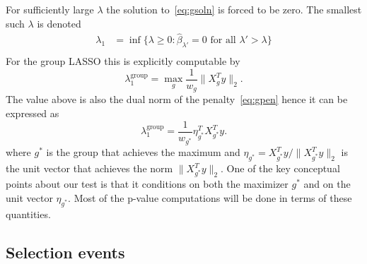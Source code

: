 \documentclass{imsart}
\begin{document}
For sufficiently large $\lambda$ the solution to~\eqref{eq:gsoln} is forced
to be zero. The smallest such $\lambda$ is denoted
\begin{equation}
  \begin{aligned}
   \lambda_1 &= \inf \{ \lambda \geq 0 : \hat \beta_{\lambda'} = 0 \text{ for all } \lambda' > \lambda \} \\
  \end{aligned}
\end{equation}
For the group LASSO this is explicitly computable by
\begin{equation}
\label{eq:lammax}
\lambda_1^{\text{group}} = \max_{g} \frac{1}{w_g}\|X_g^Ty\|_2 . 
\end{equation}
The value above is also the dual norm of the penalty~\eqref{eq:gpen}
hence it can be expressed as
\begin{equation}
\label{eq:lammax}
\lambda_1^{\text{group}}
 = \frac{1}{w_{g^*}}\eta_{g^*}^TX_{g^*}^Ty . 
\end{equation}
where $g^*$ is the group that achieves the maximum and 
$\eta_{g^*} = X_{g^*}^Ty / \|X_{g^*}^Ty\|_2$ is the unit vector that achieves the norm $\|X_{g^*}^Ty\|_2$. One of the key conceptual points about our
test is that it conditions on both the maximizer $g^*$ and on the unit
vector $\eta_{g^*}$. Most of the p-value computations will be done in
terms of these quantities.




\subsection{Selection events}
\end{document}
